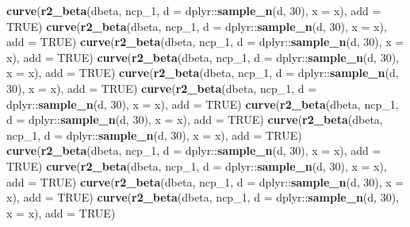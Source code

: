 \documentclass[]{article}
\newenvironment{Shaded}{\begin{snugshade}}{\end{snugshade}}
\newcommand{\KeywordTok}[1]{\textcolor[rgb]{0.13,0.29,0.53}{\textbf{{#1}}}}
\newcommand{\DataTypeTok}[1]{\textcolor[rgb]{0.13,0.29,0.53}{{#1}}}
\newcommand{\DecValTok}[1]{\textcolor[rgb]{0.00,0.00,0.81}{{#1}}}
\newcommand{\OtherTok}[1]{\textcolor[rgb]{0.56,0.35,0.01}{{#1}}}
\newcommand{\NormalTok}[1]{{#1}}
\begin{document}
\begin{Shaded}
\begin{Highlighting}[]
\KeywordTok{curve}\NormalTok{(}\KeywordTok{r2_beta}\NormalTok{(dbeta, ncp_1, }\DataTypeTok{d =} \NormalTok{dplyr::}\KeywordTok{sample_n}\NormalTok{(d, }\DecValTok{30}\NormalTok{), }\DataTypeTok{x =} \NormalTok{x), }\DataTypeTok{add =} \OtherTok{TRUE}\NormalTok{)}
\KeywordTok{curve}\NormalTok{(}\KeywordTok{r2_beta}\NormalTok{(dbeta, ncp_1, }\DataTypeTok{d =} \NormalTok{dplyr::}\KeywordTok{sample_n}\NormalTok{(d, }\DecValTok{30}\NormalTok{), }\DataTypeTok{x =} \NormalTok{x), }\DataTypeTok{add =} \OtherTok{TRUE}\NormalTok{)}
\KeywordTok{curve}\NormalTok{(}\KeywordTok{r2_beta}\NormalTok{(dbeta, ncp_1, }\DataTypeTok{d =} \NormalTok{dplyr::}\KeywordTok{sample_n}\NormalTok{(d, }\DecValTok{30}\NormalTok{), }\DataTypeTok{x =} \NormalTok{x), }\DataTypeTok{add =} \OtherTok{TRUE}\NormalTok{)}
\KeywordTok{curve}\NormalTok{(}\KeywordTok{r2_beta}\NormalTok{(dbeta, ncp_1, }\DataTypeTok{d =} \NormalTok{dplyr::}\KeywordTok{sample_n}\NormalTok{(d, }\DecValTok{30}\NormalTok{), }\DataTypeTok{x =} \NormalTok{x), }\DataTypeTok{add =} \OtherTok{TRUE}\NormalTok{)}
\KeywordTok{curve}\NormalTok{(}\KeywordTok{r2_beta}\NormalTok{(dbeta, ncp_1, }\DataTypeTok{d =} \NormalTok{dplyr::}\KeywordTok{sample_n}\NormalTok{(d, }\DecValTok{30}\NormalTok{), }\DataTypeTok{x =} \NormalTok{x), }\DataTypeTok{add =} \OtherTok{TRUE}\NormalTok{)}
\KeywordTok{curve}\NormalTok{(}\KeywordTok{r2_beta}\NormalTok{(dbeta, ncp_1, }\DataTypeTok{d =} \NormalTok{dplyr::}\KeywordTok{sample_n}\NormalTok{(d, }\DecValTok{30}\NormalTok{), }\DataTypeTok{x =} \NormalTok{x), }\DataTypeTok{add =} \OtherTok{TRUE}\NormalTok{)}
\KeywordTok{curve}\NormalTok{(}\KeywordTok{r2_beta}\NormalTok{(dbeta, ncp_1, }\DataTypeTok{d =} \NormalTok{dplyr::}\KeywordTok{sample_n}\NormalTok{(d, }\DecValTok{30}\NormalTok{), }\DataTypeTok{x =} \NormalTok{x), }\DataTypeTok{add =} \OtherTok{TRUE}\NormalTok{)}
\KeywordTok{curve}\NormalTok{(}\KeywordTok{r2_beta}\NormalTok{(dbeta, ncp_1, }\DataTypeTok{d =} \NormalTok{dplyr::}\KeywordTok{sample_n}\NormalTok{(d, }\DecValTok{30}\NormalTok{), }\DataTypeTok{x =} \NormalTok{x), }\DataTypeTok{add =} \OtherTok{TRUE}\NormalTok{)}
\KeywordTok{curve}\NormalTok{(}\KeywordTok{r2_beta}\NormalTok{(dbeta, ncp_1, }\DataTypeTok{d =} \NormalTok{dplyr::}\KeywordTok{sample_n}\NormalTok{(d, }\DecValTok{30}\NormalTok{), }\DataTypeTok{x =} \NormalTok{x), }\DataTypeTok{add =} \OtherTok{TRUE}\NormalTok{)}
\KeywordTok{curve}\NormalTok{(}\KeywordTok{r2_beta}\NormalTok{(dbeta, ncp_1, }\DataTypeTok{d =} \NormalTok{dplyr::}\KeywordTok{sample_n}\NormalTok{(d, }\DecValTok{30}\NormalTok{), }\DataTypeTok{x =} \NormalTok{x), }\DataTypeTok{add =} \OtherTok{TRUE}\NormalTok{)}
\KeywordTok{curve}\NormalTok{(}\KeywordTok{r2_beta}\NormalTok{(dbeta, ncp_1, }\DataTypeTok{d =} \NormalTok{dplyr::}\KeywordTok{sample_n}\NormalTok{(d, }\DecValTok{30}\NormalTok{), }\DataTypeTok{x =} \NormalTok{x), }\DataTypeTok{add =} \OtherTok{TRUE}\NormalTok{)}
\KeywordTok{curve}\NormalTok{(}\KeywordTok{r2_beta}\NormalTok{(dbeta, ncp_1, }\DataTypeTok{d =} \NormalTok{dplyr::}\KeywordTok{sample_n}\NormalTok{(d, }\DecValTok{30}\NormalTok{), }\DataTypeTok{x =} \NormalTok{x), }\DataTypeTok{add =} \OtherTok{TRUE}\NormalTok{)}
\end{Highlighting}
\end{Shaded}
\end{document}
